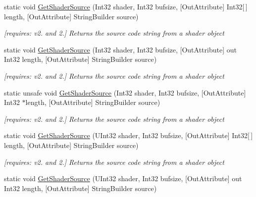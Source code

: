 \begin{DoxyCompactItemize}
static void \hyperlink{class_open_t_k_1_1_graphics_1_1_e_s20_1_1_g_l_a0c36fe8d6c36c0a488fc1d466e5072c5}{Get\-Shader\-Source} (Int32 shader, Int32 bufsize, \mbox{[}Out\-Attribute\mbox{]} Int32\mbox{[}$\,$\mbox{]} length, \mbox{[}Out\-Attribute\mbox{]} String\-Builder source)
\begin{DoxyCompactList}\small\item\em \mbox{[}requires\-: v2. and 2.\mbox{]} Returns the source code string from a shader object \end{DoxyCompactList}\item 
static void \hyperlink{class_open_t_k_1_1_graphics_1_1_e_s20_1_1_g_l_abd8e3958bf19a7ba987db4342739ee41}{Get\-Shader\-Source} (Int32 shader, Int32 bufsize, \mbox{[}Out\-Attribute\mbox{]} out Int32 length, \mbox{[}Out\-Attribute\mbox{]} String\-Builder source)
\begin{DoxyCompactList}\small\item\em \mbox{[}requires\-: v2. and 2.\mbox{]} Returns the source code string from a shader object \end{DoxyCompactList}\item 
static unsafe void \hyperlink{class_open_t_k_1_1_graphics_1_1_e_s20_1_1_g_l_a47d116d8eb7e5210953960ead1c4a51b}{Get\-Shader\-Source} (Int32 shader, Int32 bufsize, \mbox{[}Out\-Attribute\mbox{]} Int32 $\ast$length, \mbox{[}Out\-Attribute\mbox{]} String\-Builder source)
\begin{DoxyCompactList}\small\item\em \mbox{[}requires\-: v2. and 2.\mbox{]} Returns the source code string from a shader object \end{DoxyCompactList}\item 
static void \hyperlink{class_open_t_k_1_1_graphics_1_1_e_s20_1_1_g_l_a88a864c49b1df9cbdab1f46337bcf8b5}{Get\-Shader\-Source} (U\-Int32 shader, Int32 bufsize, \mbox{[}Out\-Attribute\mbox{]} Int32\mbox{[}$\,$\mbox{]} length, \mbox{[}Out\-Attribute\mbox{]} String\-Builder source)
\begin{DoxyCompactList}\small\item\em \mbox{[}requires\-: v2. and 2.\mbox{]} Returns the source code string from a shader object \end{DoxyCompactList}\item 
static void \hyperlink{class_open_t_k_1_1_graphics_1_1_e_s20_1_1_g_l_a3d54064d7dc1939346f7c747dead48f6}{Get\-Shader\-Source} (U\-Int32 shader, Int32 bufsize, \mbox{[}Out\-Attribute\mbox{]} out Int32 length, \mbox{[}Out\-Attribute\mbox{]} String\-Builder source)

\end{DoxyCompactItemize}
